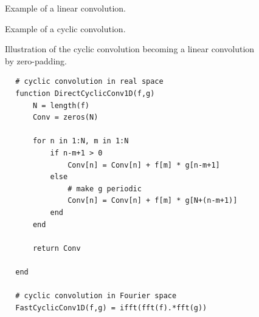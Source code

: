 \begin{figure}
    \centering
    
    \caption{Example of a linear convolution.}
    \label{fig:linear_convolution}
\end{figure}

\begin{figure}
    \centering
    
    \caption{Example of a cyclic convolution.}
    \label{fig:cyclic_convolution}
\end{figure}

\begin{figure}
    \centering
    
    \caption{Illustration of the cyclic convolution becoming a linear convolution
    by zero-padding.}
    \label{fig:cyclic_linear_convolution}
\end{figure}


\begin{codebox}
    \begin{verbatim}
        # cyclic convolution in real space
        function DirectCyclicConv1D(f,g)
            N = length(f)
            Conv = zeros(N)  

            for n in 1:N, m in 1:N
                if n-m+1 > 0
                    Conv[n] = Conv[n] + f[m] * g[n-m+1]
                else
                    # make g periodic
                    Conv[n] = Conv[n] + f[m] * g[N+(n-m+1)]
                end
            end

            return Conv

        end

        # cyclic convolution in Fourier space
        FastCyclicConv1D(f,g) = ifft(fft(f).*fft(g))
    \end{verbatim}
    \caption{Cyclic convolution in Julia.}
    \label{code:cyclic_convolution}
\end{codebox}

